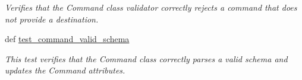 \begin{DoxyCompactItemize}
\begin{DoxyCompactList}\small\item\em Verifies that the Command class validator correctly rejects a command that does not provide a destination. \end{DoxyCompactList}\item 
def \hyperlink{classhwm_1_1command_1_1tests_1_1test__command__infrastructure_1_1_test_command_infrastructure_af10a497c4cba7f1928562dc70624157d}{test\-\_\-command\-\_\-valid\-\_\-schema}
\begin{DoxyCompactList}\small\item\em This test verifies that the Command class correctly parses a valid schema and updates the Command attributes. \end{DoxyCompactList}\end{DoxyCompactItemize}
